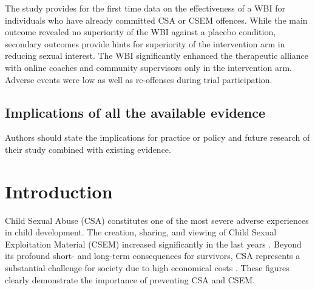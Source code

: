 \documentclass[
  super,
  preprint,
  1p,
  onecolumn]{elsarticle}
\begin{document}
The study provides for the first time data on the effectiveness of a WBI
for individuals who have already committed CSA or CSEM offences. While
the main outcome revealed no superiority of the WBI against a placebo
condition, secondary outcomes provide hints for superiority of the
intervention arm in reducing sexual interest. The WBI significantly
enhanced the therapeutic alliance with online coaches and community
supervisors only in the intervention arm. Adverse events were low as
well as re-offenses during trial participation.

\subsection*{Implications of all the available
evidence}\label{implications-of-all-the-available-evidence}

Authors should state the implications for practice or policy and future
research of their study combined with existing evidence.

\newpage{}

\section{Introduction}\label{introduction}

Child Sexual Abuse (CSA) constitutes one of the most severe adverse
experiences in child development.
\citep{piolantiGlobalPrevalenceSexual2025} The creation, sharing, and
viewing of Child Sexual Exploitation Material (CSEM) increased
significantly in the last years
\citep{baskurtMetaanalysisRecidivismRates2024}. Beyond its profound
short- and long-term consequences for survivors, CSA represents a
substantial challenge for society due to high economical costs
\citep{kewleyPreventingChildSexual2023}. These figures clearly
demonstrate the importance of preventing CSA and CSEM.
\end{document}
